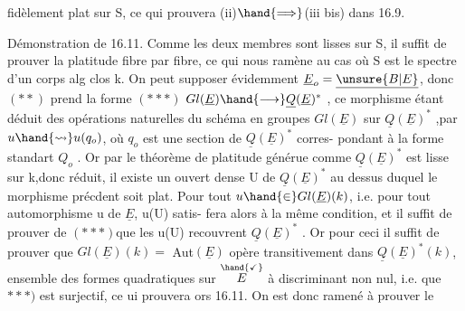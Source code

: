 
fidèlement plat sur S, ce qui prouvera  (ii)$\hand{\Longrightarrow}$(iii bis) dans  16.9.

Démonstration de 16.11.  Comme les deux membres sont lisses sur S,
il suffit de prouver la platitude fibre par fibre, ce qui nous ramène au
cas où S est le spectre d'un corps alg clos k.  On peut  supposer
évidemment $\underline{E}_o=\underline{\unsure{B|E}}$, donc $(**)$ prend la forme
$(***)$   $Gl(\underline{E})\hand{\longrightarrow}\underline{Q}(\underline{E})^*$ ,
ce morphisme étant déduit des opérations naturelles du schéma en groupes
$Gl(\underline{E})$ sur $\underline{Q}(\underline{E})^*$ ,par $u\hand{\rightsquigarrow} u(q_o)$, où $q_o$ est une section de $\underline{Q}(\underline{E})^*$ corres-%
pondant à la forme standart $Q_o$ . Or par le théorème de platitude générue\hand{,}
comme $\underline{Q}(\underline{E})^*$ est lisse sur k,donc réduit, il existe un ouvert dense U de
$\underline{Q}(\underline{E})^*$ au dessus duquel le morphisme précdent soit plat.  Pour tout 
$u\hand{\in}Gl(\underline{E})(k)$, i.e. pour tout automorphisme u de $\underline{E}$, u(U) satis-%
fera alors à la même condition, et il suffit\hand{$\unsure{\leftarrow}$} de prouver\hand{,} \hand{$\downarrow$}
de $(***)$\hand{,}que les u(U) recouvrent $\underline{Q}(\underline{E})^*$ . Or pour ceci il suffit de prouver
que $Gl(\underline{E})(k)=$ Aut$(\underline{E})$ opère transitivement dans $\underline{Q}(\underline{E})^*(k)$, ensemble des
formes quadratiques  sur $\overset{\hand{\checkmark}}{E}$ à discriminant non nul,  i.e. que
$***)$ est surjectif, ce ui prouvera ors 16.11.  On est donc ramené à
prouver le

